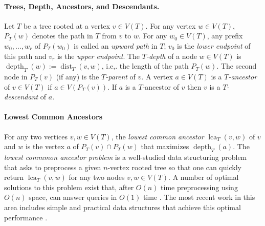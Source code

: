\documentclass{patmorin}
\DeclareMathOperator{\lca}{lca}
\DeclareMathOperator{\depth}{depth}
\DeclareMathOperator{\dist}{dist}
\begin{document}
\paragraph{Trees, Depth, Ancestors, and Descendants.}

Let $T$ be a tree rooted at a vertex $v\in V(T)$.  For any vertex $w\in V(T)$, $P_T(w)$ denotes the path in $T$ from $v$ to $w$.  For any $w_0\in V(T)$, any prefix $w_0,\ldots,w_r$ of $P_T(w_0)$ is called an \emph{upward path} in $T$; $v_0$ is the \emph{lower endpoint} of this path and $v_r$ is the \emph{upper endpoint}.  The \emph{$T$-depth} of a node $w\in V(T)$ is $\depth_T(w):=\dist_T(v,w)$, i.e,. the length of the path $P_T(w)$. The second node in $P_T(v)$ (if any) is the \emph{$T$-parent} of $v$.  A vertex $a\in V(T)$ is a \emph{$T$-ancestor} of $v\in V(T)$ if $a\in V(P_T(v))$. If $a$ is a $T$-ancestor of $v$ then $v$ is a \emph{$T$-descendant} of $a$.


\paragraph{Lowest Common Ancestors}

For any two vertices $v,w\in V(T)$, the \emph{lowest common ancestor} $\lca_T(v,w)$ of $v$ and $w$ is the vertex $a$ of $P_T(v)\cap P_T(w)$ that maximizes $\depth_T(a)$.  The \emph{lowest commmon ancestor problem} is a well-studied data structuring problem that asks to preprocess a given $n$-vertex rooted tree so that one can quickly return $\lca_T(v,w)$ for any two nodes $v,w\in V(T)$. A number of optimal solutions to this problem exist that, after $O(n)$ time preprocessing using $O(n)$ space, can answer queries in $O(1)$ time \cite{berman.vishkin:recursive,shieber.vishkin:on,harel.tarjan:fast,alstrup.gavoille.ea:nearest,bender.farach-colton:lca,fischer.heun:theoretical}.  The most recent work in this area includes simple and practical data structures that achieve this optimal performance \cite{alstrup.gavoille.ea:nearest,bender.farach-colton:lca,fischer.heun:theoretical}.
\end{document}
